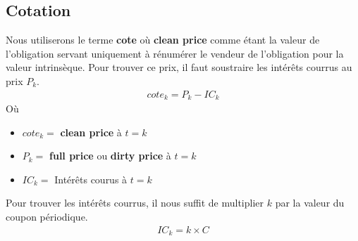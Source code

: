 \documentclass[letterpaper, 12pt]{article}
\newcommand{\1}{\mathds{1}}	%
\theoremstyle{definition}
\begin{document}
\subsection{Cotation}
Nous utiliserons le terme \textbf{cote} où \textbf{clean price} comme étant la valeur de l'obligation servant uniquement à rénumérer le vendeur de l'obligation pour la valeur intrinsèque. Pour trouver  ce prix, il faut soustraire les intérêts courrus au prix $P_k$.
\begin{align*}
cote_k=P_k-IC_k
\end{align*}
Où
\begin{itemize}
\item $cote_k=$ \textbf{clean price} à $t=k$
\item $P_k=$ \textbf{full price} ou \textbf{dirty price} à $t=k$
\item $IC_k=$ Intérêts courus à $t=k$
\end{itemize}

Pour trouver les intérêts courrus, il nous suffit de multiplier $k$ par la valeur du coupon périodique.
\begin{align*}
IC_k= k \times C
\end{align*}
\end{document}
